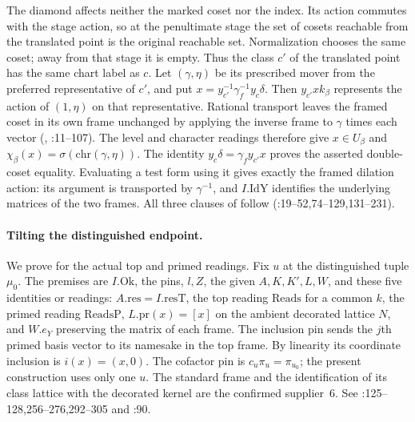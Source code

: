The diamond affects neither the marked coset nor the index. Its action
commutes with the stage action, so at the penultimate stage the set of
cosets reachable from the translated point is the original reachable
set. Normalization chooses the same coset; away from that stage it is
empty. Thus the class $c'$ of the translated point has the same chart
label as $c$. Let $(\gamma,\eta)$ be its prescribed mover from the
preferred representative of $c'$, and put
$x=y_{c'}^{-1}\gamma_f^{-1}y_c\delta$. Then $y_{c'}xk_\beta$
represents the action of $(1,\eta)$ on that representative.
Rational transport leaves the framed coset in its own frame unchanged
by applying the inverse frame to $\gamma$ times each vector
(, :11--107). The level
and character readings therefore give $x\in U_\beta$ and
$\chi_\beta(x)=\sigma(\mathrm{chr}(\gamma,\eta))$. The identity
$y_c\delta=\gamma_f y_{c'}x$ proves the asserted double-coset equality.
Evaluating a test form using it gives exactly the framed dilation action:
its argument is transported by $\gamma^{-1}$, and $I.\mathrm{IdY}$
identifies the underlying matrices of the two frames. All three clauses
of  follow
(:19--52,74--129,131--231).

\paragraph{Tilting the distinguished endpoint.}
We prove  for the actual top and primed readings.
Fix $u$ at the distinguished tuple $\mu_0$. The premises are $I.\mathrm{Ok}$,
the pins, $l,Z$, the given $A,K,K',L,W$, and these five identities or
readings: $A.\mathrm{res}=I.\mathrm{resT}$, the top reading
$\mathrm{Reads}$ for a common $k$, the primed reading $\mathrm{ReadsP}$,
$L.\mathrm{pr}(x)=[x]$ on the ambient decorated lattice $N$, and
$W.e_Y$ preserving the matrix of each frame.
The inclusion pin sends the $j$th primed basis vector to its namesake in
the top frame. By linearity its coordinate inclusion is $i(x)=(x,0)$.
The cofactor pin is $c_u\pi_u=\pi_{u_0}$; the present construction
uses only one $u$. The standard frame and the identification of its
class lattice with the decorated kernel are the confirmed supplier~6.
See :125--128,256--276,292--305 and
:90.

